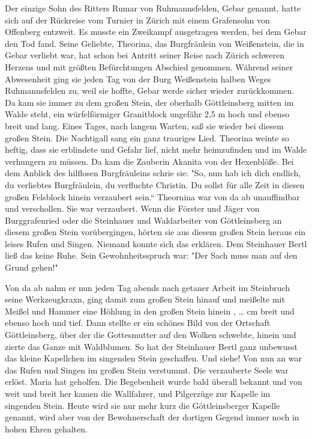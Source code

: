 Der einzige Sohn des Ritters Rumar von Ruhmannsfelden, Gebar genannt, hatte sich
auf der Rückreise vom Turnier in Zürich mit einem Grafensohn von Offenberg
entzweit. Es musste ein Zweikampf ausgetragen werden, bei dem Gebar den Tod
fand. Seine Geliebte, Theorina, das Burgfräulein von Weißenstein, die in Gebar
verliebt war, hat schon bei Antritt seiner Reise nach Zürich schweren Herzens
und mit größten Befürchtungen Abschied genommen. Während seiner Abwesenheit ging
sie jeden Tag von der Burg Weißenstein halben Weges Ruhmannsfelden zu, weil sie
hoffte, Gebar werde sicher wieder zurückkommen. Da kam sie immer zu dem großen
Stein, der oberhalb Göttleinsberg mitten im Walde steht, ein würfelförmiger
Granitblock ungefähr 2,5 m hoch und ebenso breit und lang. Eines Tages, nach
langem Warten, saß sie wieder bei diesem großen Stein. Die Nachtigall sang ein
ganz trauriges Lied. Theorina weinte so heftig, dass sie erblindete und Gefahr
lief, nicht mehr heimzufinden und im Walde verhungern zu müssen. Da kam die
Zauberin Akanita von der Hexenblöße. Bei dem Anblick des hilflosen Burgfräuleins
schrie sie: "So, nun hab ich dich endlich, du verliebtes Burgfräulein, du
verfluchte Christin. Du sollst für alle Zeit in diesen großen Felsblock hinein
verzaubert sein.“ Theornina war von da ab unauffindbar und verschollen. Sie war
verzaubert. Wenn die Förster und Jäger von Burggrafenried oder die Steinhauer
und Waldarbeiter von Göttleinsberg an diesem großen Stein vorübergingen, hörten
sie aus diesem großen Stein heraus ein leises Rufen und Singen. Niemand konnte
sich das erklären. Dem Steinhauer Bertl ließ das keine Ruhe. Sein
Gewohnheitsspruch war: "Der Sach muss man auf den Grund gehen!"

Von da ab nahm er nun jeden Tag abends nach getaner Arbeit im Steinbruch seine
Werkzeugkraxn, ging damit zum großen Stein hinauf und meißelte mit Meißel und
Hammer eine Höhlung in den großen Stein hinein , … cm breit und ebenso hoch und
tief. Dann stellte er ein schönes Bild von der Ortschaft Göttleinsberg, über der
die Gottesmutter auf den Wolken schwebte, hinein und zierte das Ganze mit
Waldblumen. So hat der Steinhauer Bertl ganz unbewusst das kleine Kapellchen im
singenden Stein geschaffen. Und siehe! Von nun an war das Rufen und Singen im
großen Stein verstummt. Die verzauberte Seele war erlöst. Maria hat geholfen.
Die Begebenheit wurde bald überall bekannt und von weit und breit her kamen die
Wallfahrer, und Pilgerzüge zur Kapelle im singenden Stein. Heute wird sie nur
mehr kurz die Göttleinsberger Kapelle genannt, wird aber von der Bewohnerschaft
der dortigen Gegend immer noch in hohen Ehren gehalten.


